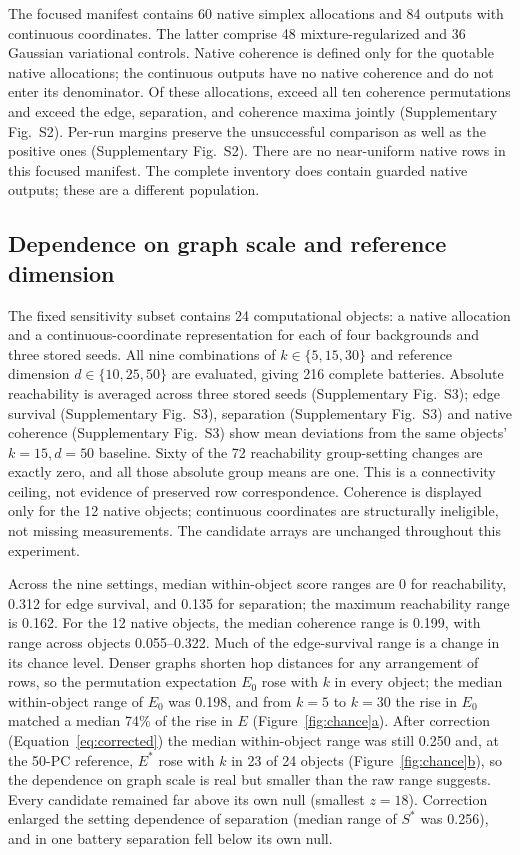 \documentclass[11pt]{article}
\newcommand{\figpanel}[2]{Figure~\hyperref[#1]{\ref*{#1}#2}}
\begin{document}
The focused manifest contains 60 native simplex allocations and 84 outputs with continuous coordinates. The latter comprise 48 mixture-regularized and 36 Gaussian variational controls. Native coherence is defined only for the \NullEligible{} quotable native allocations; the continuous outputs have no native coherence and do not enter its denominator. Of these allocations, \NullCoherence{} exceed all ten coherence permutations and \NullJoint{} exceed the edge, separation, and coherence maxima jointly (Supplementary Fig.~S2). Per-run margins preserve the unsuccessful comparison as well as the positive ones (Supplementary Fig.~S2). There are no near-uniform native rows in this focused manifest. The complete inventory does contain guarded native outputs; these are a different population.



\subsection{Dependence on graph scale and reference dimension}

The fixed sensitivity subset contains 24 computational objects: a native allocation and a continuous-coordinate representation for each of four backgrounds and three stored seeds. All nine combinations of $k\in\{5,15,30\}$ and reference dimension $d\in\{10,25,50\}$ are evaluated, giving 216 complete batteries. Absolute reachability is averaged across three stored seeds (Supplementary Fig.~S3); edge survival (Supplementary Fig.~S3), separation (Supplementary Fig.~S3) and native coherence (Supplementary Fig.~S3) show mean deviations from the same objects' $k=15,d=50$ baseline. Sixty of the 72 reachability group-setting changes are exactly zero, and all those absolute group means are one. This is a connectivity ceiling, not evidence of preserved row correspondence. Coherence is displayed only for the 12 native objects; continuous coordinates are structurally ineligible, not missing measurements. The candidate arrays are unchanged throughout this experiment.



Across the nine settings, median within-object score ranges are 0 for reachability, 0.312 for edge survival, and 0.135 for separation; the maximum reachability range is 0.162. For the 12 native objects, the median coherence range is 0.199, with range across objects 0.055--0.322. Much of the edge-survival range is a change in its chance level. Denser graphs shorten hop distances for any arrangement of rows, so the permutation expectation $E_0$ rose with $k$ in every object; the median within-object range of $E_0$ was 0.198, and from $k=5$ to $k=30$ the rise in $E_0$ matched a median 74\% of the rise in $E$ (\figpanel{fig:chance}{a}). After correction (Equation~\ref{eq:corrected}) the median within-object range was still 0.250 and, at the 50-PC reference, $E^*$ rose with $k$ in 23 of 24 objects (\figpanel{fig:chance}{b}), so the dependence on graph scale is real but smaller than the raw range suggests. Every candidate remained far above its own null (smallest $z=18$). Correction enlarged the setting dependence of separation (median range of $S^*$ was 0.256), and in one battery separation fell below its own null.
\end{document}

